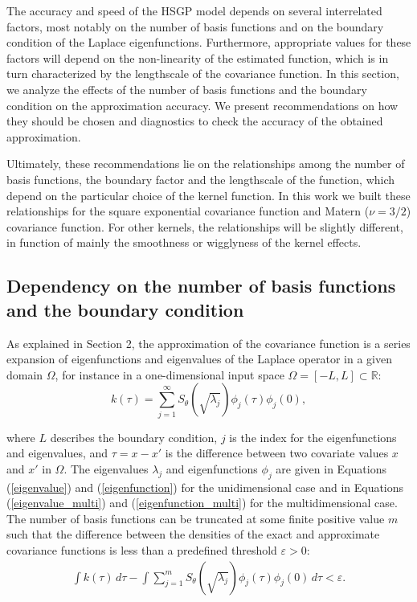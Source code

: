 \documentclass[]{interact}
\theoremstyle{plain}%
\theoremstyle{definition}
\theoremstyle{remark}
\begin{document}
The accuracy and speed of the HSGP model depends on several interrelated factors, most notably on the number of basis functions and on the boundary condition of the Laplace eigenfunctions. Furthermore, appropriate values for these factors will depend on the non-linearity of the estimated function, which is in turn characterized by the lengthscale of the covariance function.
In this section, we analyze the effects of the number of basis functions and the boundary condition on the approximation accuracy. We present recommendations on how they should be chosen and diagnostics to check the accuracy of the obtained approximation. 

Ultimately, these recommendations lie on the relationships among the number of basis functions, the boundary factor and the lengthscale of the function, which depend on the particular choice of the kernel function. In this work we built these relationships for the square exponential covariance function and Matern ($\nu=3/2$) covariance function. For other kernels, the relationships will be slightly different, in function of mainly the smoothness or wigglyness of the kernel effects.

\subsection{Dependency on the number of basis functions and the boundary condition}

As explained in Section 2, the approximation of the covariance function is a series expansion of eigenfunctions and eigenvalues of the Laplace operator in a given domain $\Omega$, for instance in a one-dimensional input space $\Omega=[-L,L]\subset \mathbb{R}$:
%
\begin{equation}\label{diffcov}
k(\tau) = \sum_{j=1}^{\infty} S_{\theta} \left(\sqrt{\lambda_j} \right) \phi_j(\tau) \phi_j(0),  \nonumber
\end{equation} 

\noindent where $L$ describes the boundary condition, $j$ is the index for the eigenfunctions and eigenvalues, and $\tau=x-x'$ is the difference between two covariate values $x$ and $x'$ in $\Omega$. The eigenvalues $\lambda_j$ and eigenfunctions $\phi_j$ are given in Equations (\ref{eigenvalue}) and (\ref{eigenfunction}) for the unidimensional case and in Equations (\ref{eigenvalue_multi}) and (\ref{eigenfunction_multi}) for the multidimensional case. The number of basis functions can be truncated at some finite positive value $m$ such that the difference between the densities of the exact and approximate covariance functions is less than a predefined threshold $\varepsilon > 0$:
%
\begin{eqnarray}\label{diff_covs}
\int k(\tau) \, d\tau - 
\int \sum_{j=1}^m S_{\theta}\left(\sqrt{\lambda_j} \right) \phi_j(\tau) \phi_j(0) \, d\tau < \varepsilon.
\end{eqnarray}
\end{document}
